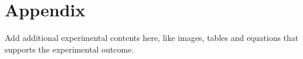 \section{Appendix} \label{section: appendix A title}
Add additional experimental contents here, like images, tables and equations that supports the experimental outcome.